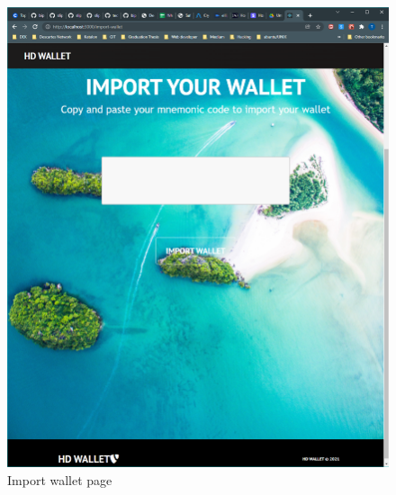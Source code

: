   \begin{figure}[h!]
    \centering
    \includegraphics[width=1\textwidth]{images/ImportWallet.png}
    \caption[Import wallet page]{Import wallet page}
    \label{fig:importwallet}
  \end{figure}

